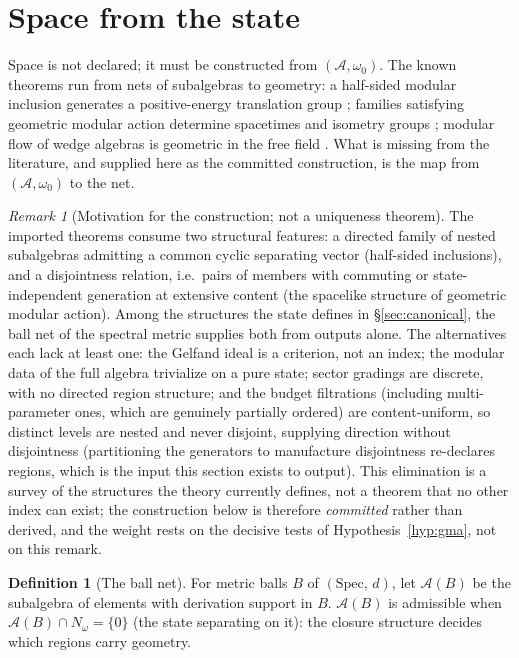 \documentclass[11pt]{article}
\theoremstyle{definition}
\newtheorem{definition}[theorem]{Definition}
\theoremstyle{remark}
\newtheorem{remark}[theorem]{Remark}
\newcommand{\A}{\mathcal{A}}
\newcommand{\w}{\omega_0}
\begin{document}
\section{Space from the state}\label{sec:space}

Space is not declared; it must be constructed from $(\A,\w)$.  The known
theorems run from nets of subalgebras to geometry: a half-sided modular
inclusion generates a positive-energy translation group
\cite{wiesbrock,guidolongo};
families satisfying geometric modular action determine spacetimes and
isometry groups \cite{summers}; modular flow of wedge algebras
is geometric in the free field \cite{bisognano}.  What is missing from
the literature, and supplied here as the committed construction, is the
map from $(\A,\w)$ to the net.

\begin{remark}[Motivation for the construction; not a uniqueness
theorem]\label{rem:exhaustion}
The imported theorems consume two structural features: a directed
family of nested subalgebras admitting a common cyclic separating
vector (half-sided inclusions), and a disjointness relation, i.e.\ pairs of
members with commuting or state-independent generation at extensive
content (the spacelike structure of geometric modular action).  Among
the structures the state defines in \S\ref{sec:canonical}, the ball net
of the spectral metric supplies both from outputs alone.  The
alternatives each lack at least one: the Gelfand ideal is a criterion,
not an index; the modular data of the full algebra trivialize on a pure
state; sector gradings are discrete, with no directed region structure;
and the budget filtrations (including multi-parameter ones, which are
genuinely partially ordered) are content-uniform, so distinct levels
are nested and never disjoint, supplying direction without
disjointness (partitioning the generators to manufacture disjointness
re-declares regions, which is the input this section exists to output).
This elimination is a survey of the structures the theory currently
defines, not a theorem that no other index can exist; the construction
below is therefore \emph{committed} rather than derived, and the weight
rests on the decisive tests of Hypothesis~\ref{hyp:gma}, not on this
remark.
\end{remark}

\begin{definition}[The ball net]\label{def:ballnet}
For metric balls $B$ of $(\mathrm{Spec},\, d)$, let $\A(B)$ be the
subalgebra of elements with derivation support in $B$.  $\A(B)$ is
admissible when $\A(B) \cap N_\omega = \{0\}$ (the state separating on
it): the closure structure decides which regions carry geometry.
\end{definition}
\end{document}
